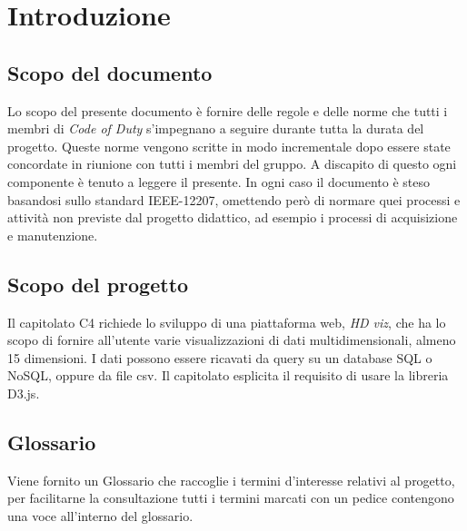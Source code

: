 \section{Introduzione}
    \subsection{Scopo del documento}
    Lo scopo del presente documento è fornire delle regole e delle norme che tutti i membri di \textit{Code of Duty} s'impegnano a seguire durante tutta la durata del progetto. Queste norme vengono scritte in modo incrementale dopo essere state concordate in riunione con tutti i membri del gruppo.
    A discapito di questo ogni componente è tenuto a leggere il presente.
    In ogni caso il documento è steso basandosi sullo standard IEEE-12207, omettendo però di normare quei processi e attività non previste dal progetto didattico, ad esempio i processi di acquisizione e manutenzione. 
    \subsection{Scopo del progetto}
    Il capitolato C4 richiede lo sviluppo di una piattaforma web, \textit{HD viz}, che ha lo scopo di fornire all'utente varie visualizzazioni di dati multidimensionali, almeno 15 dimensioni. I dati possono essere ricavati da query su un database SQL o NoSQL, oppure da file csv. Il capitolato esplicita il requisito di usare la libreria D3.js.
    \subsection{Glossario}
    Viene fornito un Glossario che raccoglie i termini d'interesse relativi al progetto, per facilitarne la consultazione tutti i termini marcati con un pedice \glo{} contengono una voce all'interno del glossario.